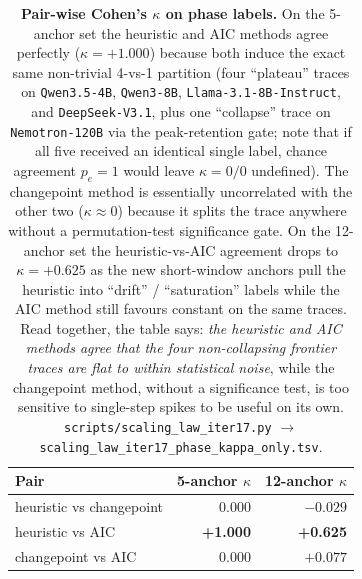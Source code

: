 \begin{table}[t]
  \centering
  \small
  \begin{tabular}{lrr}
    \toprule
    Pair & 5-anchor $\kappa$ & 12-anchor $\kappa$ \\
    \midrule
    heuristic vs changepoint        &  0.000 & $-0.029$ \\
    heuristic vs AIC                & \textbf{+1.000} & \textbf{+0.625} \\
    changepoint vs AIC              &  0.000 & $+0.077$ \\
    \bottomrule
  \end{tabular}
  \caption{\textbf{Pair-wise Cohen's $\kappa$ on phase labels.}
    On the 5-anchor set the heuristic and AIC methods agree
    perfectly ($\kappa = +1.000$) because both induce the exact
    same non-trivial 4-vs-1 partition (four ``plateau'' traces on
    \texttt{Qwen3.5-4B}, \texttt{Qwen3-8B},
    \texttt{Llama-3.1-8B-Instruct}, and \texttt{DeepSeek-V3.1}, plus
    one ``collapse'' trace on \texttt{Nemotron-120B} via the
    peak-retention gate; note that if all five received an identical
    single label, chance agreement $p_e=1$ would leave $\kappa = 0/0$
    undefined).  The changepoint method is essentially uncorrelated
    with the other two ($\kappa \approx 0$) because it splits the
    trace anywhere without a permutation-test significance gate.
    On the 12-anchor set the heuristic-vs-AIC agreement drops
    to $\kappa = +0.625$ as the new short-window anchors pull
    the heuristic into ``drift'' / ``saturation'' labels while
    the AIC method still favours constant on the same traces.
    Read together, the table says: \emph{the heuristic and AIC
    methods agree that the four non-collapsing frontier traces are
    flat to within statistical noise}, while the changepoint method,
    without a significance test, is too sensitive to single-step
    spikes to be useful on its own.
    \texttt{scripts/scaling\_law\_iter17.py} $\to$
    \texttt{scaling\_law\_iter17\_phase\_kappa\_only.tsv}.}
  \label{tab:scaling-iter17-kappa}
\end{table}

